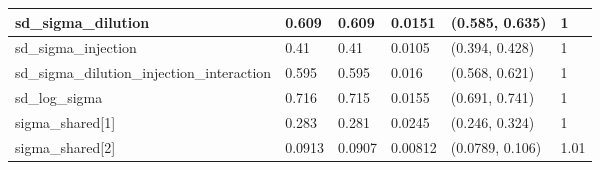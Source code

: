 \begin{tabular}{l|l|l|l|l|l}
\hline
sd\_sigma\_dilution & 0.609 & 0.609 & 0.0151 & (0.585, 0.635) & 1\\
\hline
sd\_sigma\_injection & 0.41 & 0.41 & 0.0105 & (0.394, 0.428) & 1\\
\hline
sd\_sigma\_dilution\_injection\_interaction & 0.595 & 0.595 & 0.016 & (0.568, 0.621) & 1\\
\hline
sd\_log\_sigma & 0.716 & 0.715 & 0.0155 & (0.691, 0.741) & 1\\
\hline
sigma\_shared[1] & 0.283 & 0.281 & 0.0245 & (0.246, 0.324) & 1\\
\hline
sigma\_shared[2] & 0.0913 & 0.0907 & 0.00812 & (0.0789, 0.106) & 1.01\\
\hline
\end{tabular}
